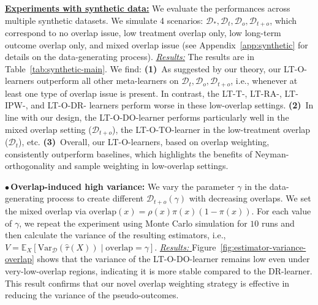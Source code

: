 \documentclass{article}
\theoremstyle{plain}
\theoremstyle{definition}
\theoremstyle{remark}
\newcommand{\E}{\mathbb{E}}                %
\newcommand{\var}{\mathrm{Var}}            %
\newcommand{\1}{\mathds{1}}                %
\newcommand{\methods}{LT-O-learners\xspace}
\newcommand{\TO}{LT-O-TO-learner\xspace}
\newcommand{\DO}{LT-O-DO-learner\xspace}
\begin{document}
\underline{\textbf{Experiments with synthetic data:}} We evaluate the performances across multiple synthetic datasets. We simulate 4 scenarios: $\mathcal{D}_*, \mathcal{D}_t, \mathcal{D}_o, \mathcal{D}_{t+o}$, which correspond to no overlap issue, low treatment overlap only, low long-term outcome overlap only, and mixed overlap issue (see Appendix~\ref{app:synthetic} for details on the data-generating process). 
\underline{\emph{Results:}} The results are in Table~\ref{tab:synthetic-main}. We find: \textbf{(1)}~As suggested by our theory, our \methods outperform all other meta-learners on $\mathcal{D}_t, \mathcal{D}_o, \mathcal{D}_{t+o}$, i.e., whenever at least one type of overlap issue is present. In contrast, the LT-T-, LT-RA-, LT-IPW-, and LT-O-DR- learners perform worse in these low-overlap settings. \textbf{(2)}~In line with our design, the \DO performs particularly well in the mixed overlap setting ($\mathcal{D}_{t+o}$), the \TO in the low-treatment overlap ($\mathcal{D}_{t}$), etc. \textbf{(3)}~Overall, our \methods, based on overlap weighting,  consistently outperform baselines, which highlights the benefits of Neyman-orthogonality and sample weighting in low-overlap settings.  



\textbf{$\bullet$\,Overlap-induced high variance:} We vary the parameter $\gamma$ in the data-generating process to create different $\mathcal{D}_{t+o}(\gamma)$ with decreasing overlaps. We set the mixed overlap via $\text{overlap}(x) = \rho(x)\pi(x)(1-\pi(x))$. For each value of $\gamma$, we repeat the experiment using Monte Carlo simulation for $10$ runs and then calculate the variance of the resulting estimators, i.e., $V=\E_X\left[\var_{\mathcal{D}}(\hat\tau(X)) \mid \text{overlap}=\gamma\right]$.
\underline{\textit{Results: }} Figure~\ref{fig:estimator-variance-overlap} shows that the variance of the \DO remains low even under very-low-overlap regions, indicating it is more stable compared to the DR-learner. This result confirms that our novel overlap weighting strategy is effective in reducing the variance of the pseudo-outcomes.
\end{document}
